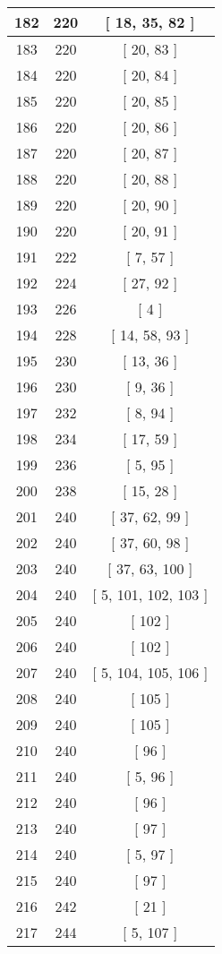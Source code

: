 \begin{center}
\begin{longtable}[H]{|| c c c ||}
\hline
182 & 220 & [ 18, 35, 82 ] \\ 
\hline
183 & 220 & [ 20, 83 ] \\ 
\hline
184 & 220 & [ 20, 84 ] \\ 
\hline
185 & 220 & [ 20, 85 ] \\ 
\hline
186 & 220 & [ 20, 86 ] \\ 
\hline
187 & 220 & [ 20, 87 ] \\ 
\hline
188 & 220 & [ 20, 88 ] \\ 
\hline
189 & 220 & [ 20, 90 ] \\ 
\hline
190 & 220 & [ 20, 91 ] \\ 
\hline
191 & 222 & [ 7, 57 ] \\ 
\hline
192 & 224 & [ 27, 92 ] \\ 
\hline
193 & 226 & [ 4 ] \\ 
\hline
194 & 228 & [ 14, 58, 93 ] \\ 
\hline
195 & 230 & [ 13, 36 ] \\ 
\hline
196 & 230 & [ 9, 36 ] \\ 
\hline
197 & 232 & [ 8, 94 ] \\ 
\hline
198 & 234 & [ 17, 59 ] \\ 
\hline
199 & 236 & [ 5, 95 ] \\ 
\hline
200 & 238 & [ 15, 28 ] \\ 
\hline
201 & 240 & [ 37, 62, 99 ] \\ 
\hline
202 & 240 & [ 37, 60, 98 ] \\ 
\hline
203 & 240 & [ 37, 63, 100 ] \\ 
\hline
204 & 240 & [ 5, 101, 102, 103 ] \\ 
\hline
205 & 240 & [ 102 ] \\ 
\hline
206 & 240 & [ 102 ] \\ 
\hline
207 & 240 & [ 5, 104, 105, 106 ] \\ 
\hline
208 & 240 & [ 105 ] \\ 
\hline
209 & 240 & [ 105 ] \\ 
\hline
210 & 240 & [ 96 ] \\ 
\hline
211 & 240 & [ 5, 96 ] \\ 
\hline
212 & 240 & [ 96 ] \\ 
\hline
213 & 240 & [ 97 ] \\ 
\hline
214 & 240 & [ 5, 97 ] \\ 
\hline
215 & 240 & [ 97 ] \\ 
\hline
216 & 242 & [ 21 ] \\ 
\hline
217 & 244 & [ 5, 107 ] \\ 

\end{longtable}
\end{center}
